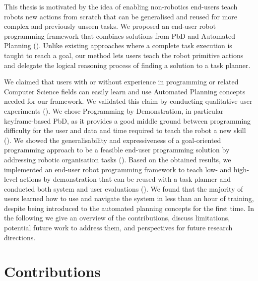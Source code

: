 This thesis is motivated by the idea of enabling non-robotics end-users teach robots new actions from scratch that can be generalised and reused for more complex and previously unseen tasks.
We proposed an end-user robot programming framework that combines solutions from PbD and Automated Planning ().
Unlike existing approaches where a complete task execution is taught to reach a goal, our method lets users teach the robot primitive actions and delegate the logical reasoning process of finding a solution to a task planner.

We claimed that users with or without experience in programming or related Computer Science fields can easily learn and use Automated Planning concepts needed for our framework.
We validated this claim by conducting qualitative user experiments ().
We chose Programming by Demonstration, in particular keyframe-based PbD, as it provides a good middle ground between programming difficulty for the user and data and time required to teach the robot a new skill ().
We showed the generalisability and expressiveness of a goal-oriented programming approach to be a feasible end-user programming solution by addressing robotic organisation tasks ().
Based on the obtained results, we implemented an end-user robot programming framework to teach low- and high-level actions by demonstration that can be reused with a task planner and conducted both system and user evaluations ().
We found that the majority of users learned how to use and navigate the system in less than an hour of training, despite being introduced to the automated planning concepts for the first time.
In the following we give an overview of the contributions, discuss limitations, potential future work to address them, and perspectives for future research directions.

\section{Contributions}
\label{sec:contributions}

